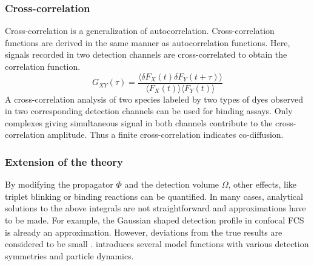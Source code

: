 	\subsubsection{Cross-correlation}
	Cross-correlation is a generalization of autocorrelation. Cross-correlation functions are derived in the same manner as autocorrelation functions. Here, signals recorded in two detection channels are cross-correlated to obtain the correlation function.
	\begin{equation}
	G_{XY}(\tau) = \frac{\langle \delta F_X(t) \delta F_Y(t+\tau) \rangle}{\langle F_X(t) \rangle \langle F_Y(t) \rangle}
	\end{equation}
A cross-correlation analysis of two species labeled by two types of dyes observed in two corresponding detection channels can be used for binding assays. Only complexes giving simultaneous signal in both channels contribute to the cross-correlation amplitude. Thus a finite cross-correlation indicates co-diffusion.
	
   \subsubsection{Extension of the theory}
	By modifying the propagator $\Phi$ and the detection volume $\Omega$, other effects, like triplet blinking or binding reactions can be quantified. In many cases, analytical solutions to the above integrals are not straightforward and approximations have to be made. For example, the Gaussian shaped detection profile in confocal FCS is already an approximation. However, deviations from the true results are considered to be small \cite{Zhang2007}.  introduces several model functions with various detection symmetries and particle dynamics.


